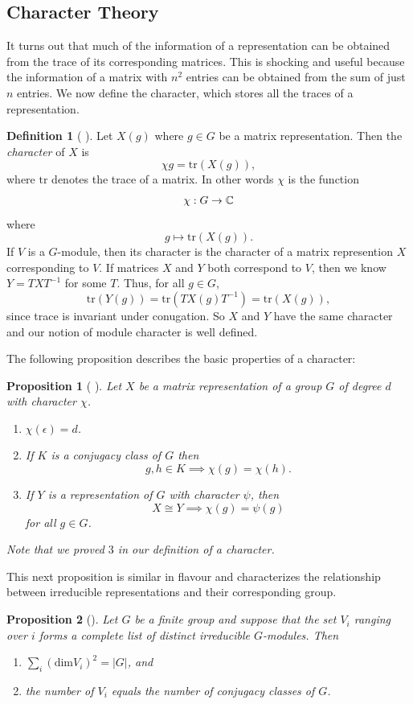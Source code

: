 \documentclass[12pt,twoside]{reedthesis}
\theoremstyle{plain}   %
\newtheorem{prop}{Proposition}[section]
\theoremstyle{definition}
\newtheorem{defn}{Definition}[section]
\theoremstyle{remark}
\numberwithin{equation}{section}
\def\dim{\mathrm{dim}}
\def\tr{\mathrm{tr}}
\begin{document}
  \subsection{Character Theory}
  It turns out that much of the information of a representation can be obtained from the trace of its corresponding matrices.
  This is shocking and useful because the information of a matrix with $n^2$ entries can be obtained from the sum of just $n$ entries.
  We now define the character, which stores all the traces of a representation.
  \begin{defn}[{ \cite[Definition 1.8.1]{sagan} }]
    Let $X(g)$ where $g \in G$ be a matrix representation. Then the \emph{character} of $X$ is
    \[ \chi{g} = \tr (X(g)),\]
    where $\tr$ denotes the trace of a matrix. In other words $\chi$ is the function
    \[\chi: G \to \mathbb{C}\]
    where
    \[g \mapsto \tr (X(g)).\]
    If $V$ is a $G$-module, then its character is the character of a matrix represention $X$ corresponding to $V$.
    If matrices $X$ and $Y$ both correspond to $V$, then we know $Y = TXT^{-1}$ for some $T$. Thus, for all $g \in G$,
    \[\tr ( Y(g)) = \tr( TX(g)T^{-1}) = \tr( X(g)),\]
    since trace is invariant under conugation. So $X$ and $Y$ have the same character and our notion of module character is well defined.
  \end{defn}
  The following proposition describes the basic properties of a character:
  \begin{prop}[{ \cite[Proposition 1.8.5]{sagan} }]
    Let $X$ be a matrix representation of a group $G$ of degree $d$ with character $\chi$.
    \begin{enumerate}
    \item $\chi( \epsilon) = d$.
    \item If $K$ is a conjugacy class of $G$ then
      \[ g, h \in K \implies \chi(g) = \chi(h). \]
    \item If $Y$ is a representation of $G$ with character $\psi$, then
      \[ X \cong Y \implies \chi(g) = \psi(g) \]
      for all $g \in G$.
    \end{enumerate}
    Note that we proved $3$ in our definition of a character.
  \end{prop}
    
  This next proposition is similar in flavour and characterizes the relationship between irreducible representations
  and their corresponding group.

  \begin{prop}[{\cite[Proposition 1.10.1]{sagan}}]
    Let $G$ be a finite group and suppose that the set $V_i$ ranging over $i$ forms a complete list of
    distinct irreducible $G$-modules. Then
    \begin{enumerate}
    \item $\sum_i (\dim V_i)^2 = |G|$, and
    \item the number of $V_i$ equals the number of conjugacy classes of $G$.
    \end{enumerate}
  \end{prop}   
  
\end{document}
